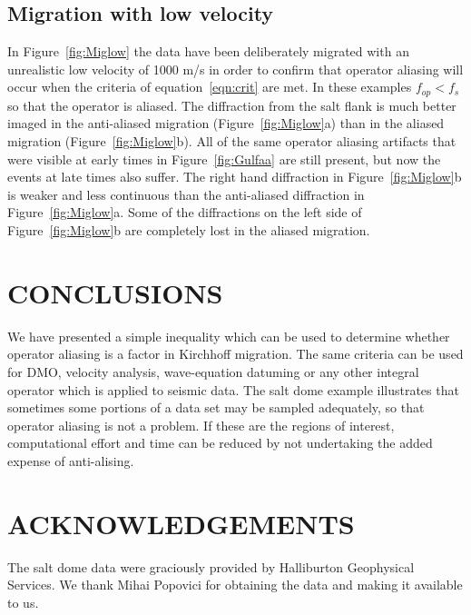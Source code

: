 \subsection{Migration with low velocity}
In Figure~\ref{fig:Miglow} the data have been deliberately
migrated with an unrealistic
low velocity of 1000 m/s in order to confirm that operator aliasing
will occur when the criteria of equation~\ref{eqn:crit} are met.
In these examples $f_{op} < f_s$ so that the operator is aliased.
The diffraction from the salt flank is much better imaged in the
anti-aliased migration (Figure~\ref{fig:Miglow}a) than in the aliased
migration (Figure~\ref{fig:Miglow}b).  All of the same operator aliasing 
artifacts  that were visible at early times in Figure~\ref{fig:Gulfaa} are
still present, but now the events at late times also suffer. The
right hand diffraction in Figure~\ref{fig:Miglow}b is weaker and less continuous
than the anti-aliased diffraction in Figure~\ref{fig:Miglow}a.
Some of the diffractions on the left side of Figure~\ref{fig:Miglow}b are
completely lost in the aliased migration.


\section{CONCLUSIONS}
We have presented a simple inequality which can be used to determine
whether operator aliasing is a factor in Kirchhoff migration. The same
criteria can be used for DMO, velocity analysis, wave-equation datuming
or any other integral operator which is applied to seismic data.
The salt dome example illustrates that sometimes some portions of a data set
may be sampled adequately, so that operator aliasing is not a problem.
If these are the regions of interest, computational effort
and time can be reduced by not undertaking the added expense 
of anti-alising.

\section{ACKNOWLEDGEMENTS}
The salt dome data were graciously provided by Halliburton Geophysical Services.
We thank Mihai Popovici for obtaining the data and making it available to us.




